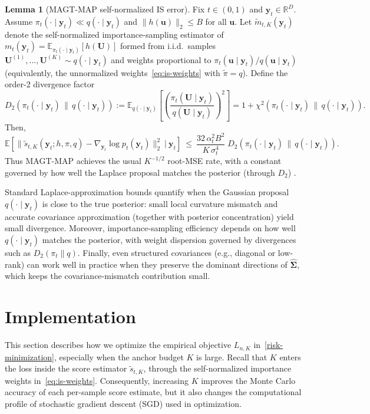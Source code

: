 \documentclass[12pt]{article}
\theoremstyle{definition} %
\newtheorem{lemma}{Lemma}
\newcommand{\R}{\mathbb{R}}
\newcommand{\y}{\bm y}
\providecommand{\E}{\mathbb{E}}
\providecommand{\method}{MAGT} %
\begin{document}
\begin{lemma}[\method{}-MAP self-normalized IS error]\label{lem:snis-map}
Fix $t\in(0,1)$ and $\y_t\in\R^D$.
Assume $\pi_t(\cdot\mid \y_t)\ll q(\cdot\mid \y_t)$ and $\|h(\bm u)\|_2\le B$ for all $\bm u$.
Let $\widetilde m_{t,K}(\y_t)$ denote the self-normalized importance-sampling estimator of
$m_t(\y_t)=\E_{\pi_t(\cdot\mid \y_t)}[h(\bm U)]$
formed from i.i.d.\ samples $\bm U^{(1)},\ldots,\bm U^{(K)}\sim q(\cdot\mid \y_t)$ and weights proportional to
$\pi_t(\bm u\mid \y_t)/q(\bm u\mid \y_t)$ (equivalently, the unnormalized weights~\eqref{eq:is-weights} with $\tilde\pi=q$).
Define the order-2 divergence factor
\[
D_2\!\left(\pi_t(\cdot\mid \y_t)\,\big\|\,q(\cdot\mid \y_t)\right)
:=
\E_{q(\cdot\mid \y_t)}\!\left[\left(\frac{\pi_t(\bm U\mid \y_t)}{q(\bm U\mid \y_t)}\right)^2\right]
=1+\chi^2\!\left(\pi_t(\cdot\mid \y_t)\,\big\|\,q(\cdot\mid \y_t)\right).
\]
Then,
\[
\E\!\left[\big\|\widetilde s_{t,K}(\y_t;h,\pi,q)-\nabla_{\y_t}\log p_t(\y_t)\big\|_2^2\ \Big|\ \y_t\right]
\ \le\ \frac{32\,\alpha_t^2 B^2}{K\,\sigma_t^4}\;
D_2\!\left(\pi_t(\cdot\mid \y_t)\,\big\|\,q(\cdot\mid \y_t)\right).
\]
Thus \method{}-MAP achieves the usual $K^{-1/2}$ root-MSE rate, with a constant governed by how well the Laplace proposal matches the posterior
(through $D_2$) \citep{owen2013mc}.
\end{lemma}

Standard Laplace-approximation bounds quantify when the Gaussian proposal $q(\cdot\mid \y_t)$ is close to the true posterior:
small local curvature mismatch and accurate covariance approximation (together with posterior concentration) yield small divergence. Moreover, importance-sampling efficiency depends on how well $q(\cdot\mid \y_t)$ matches the posterior, with weight dispersion governed by divergences such as $D_2(\pi_t\|q)$.
Finally, even structured covariances (e.g., diagonal or low-rank) can work well in practice when they preserve the dominant directions of $\hat{\bm\Sigma}$,
which keeps the covariance-mismatch contribution small.


 
\section{Implementation}
\label{sec:implementation}

This section describes how we optimize the empirical objective $L_{n,K}$ in~\eqref{risk-minimization},
especially when the anchor budget $K$ is large. Recall that $K$ enters the loss inside the score estimator $\widetilde s_{t,K}$, through the self-normalized importance weights in~\eqref{eq:is-weights}. Consequently, increasing $K$ improves the Monte Carlo accuracy of each per-sample score estimate, but it also changes the computational profile of stochastic gradient descent (SGD) used in optimization.
\end{document}
